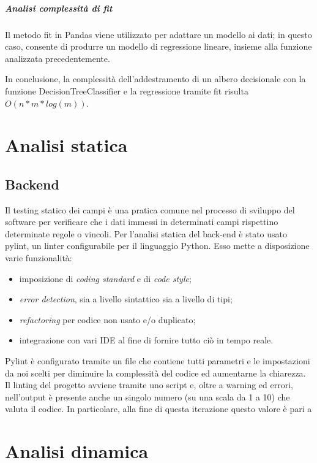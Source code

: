 \vspace{0.3cm}
\subparagraph{Analisi complessità di \textit{fit}}
Il metodo fit in Pandas viene utilizzato per adattare un modello ai dati; in questo caso,
consente di produrre un modello di regressione lineare, insieme alla funzione analizzata
precedentemente. 
\vspace{0.5cm}


In conclusione, la complessità dell'addestramento di un albero decisionale 
con la funzione DecisionTreeClassifier e la regressione tramite fit 
risulta $O(n * m * log(m))$.






\newpage
\section{Analisi statica}
\subsection{Backend}
Il testing statico dei campi è una pratica comune nel processo di sviluppo del software 
per verificare che i dati immessi in determinati campi rispettino determinate regole o vincoli. 
Per l'analisi statica del back-end è stato usato pylint, un linter configurabile per il 
linguaggio Python. Esso mette a disposizione varie funzionalità:
\begin{itemize}
    \item imposizione di \textit{coding standard} e di \textit{code style};
    \item \textit{error detection}, sia a livello sintattico sia a livello di tipi;
    \item \textit{refactoring} per codice non usato e/o duplicato;
    \item integrazione con vari IDE al fine di fornire tutto ciò in tempo reale. 
\end{itemize}
Pylint è configurato tramite un file che contiene tutti parametri e le impostazioni 
da noi scelti per diminuire la complessità del codice ed aumentarne la chiarezza.
Il linting del progetto avviene tramite uno script e, oltre a warning ed errori, 
nell'output è presente anche un singolo numero (su una scala da 1 a 10) che valuta il codice. 
In particolare, alla fine di questa iterazione questo valore è pari a



\section{Analisi dinamica}
